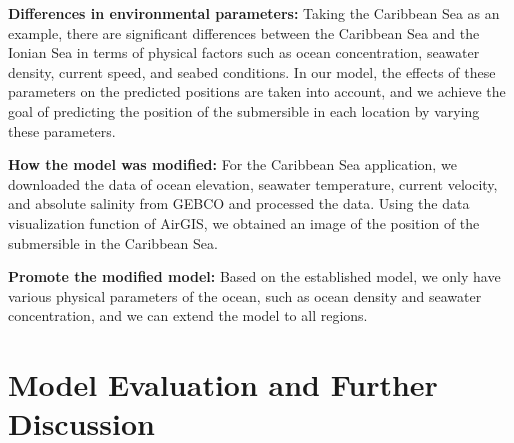 \documentclass[12pt]{article}
\begin{document}
\textbf{Differences in environmental parameters:} Taking the Caribbean Sea as an example, there are significant differences between the Caribbean Sea and the Ionian Sea in terms of physical factors such as ocean concentration, seawater density, current speed, and seabed conditions. In our model, the effects of these parameters on the predicted positions are taken into account, and we achieve the goal of predicting the position of the submersible in each location by varying these parameters.

\textbf{How the model was modified:} For the Caribbean Sea application, we downloaded the data of ocean elevation, seawater temperature, current velocity, and absolute salinity from GEBCO and processed the data. Using the data visualization function of AirGIS, we obtained an image of the position of the submersible in the Caribbean Sea.

\textbf{Promote the modified model:} Based on the established model, we only have various physical parameters of the ocean, such as ocean density and seawater concentration, and we can extend the model to all regions.

\begin{figure}[h!]
    \centering
\end{figure}

\section{Model Evaluation and Further Discussion}
\end{document}
